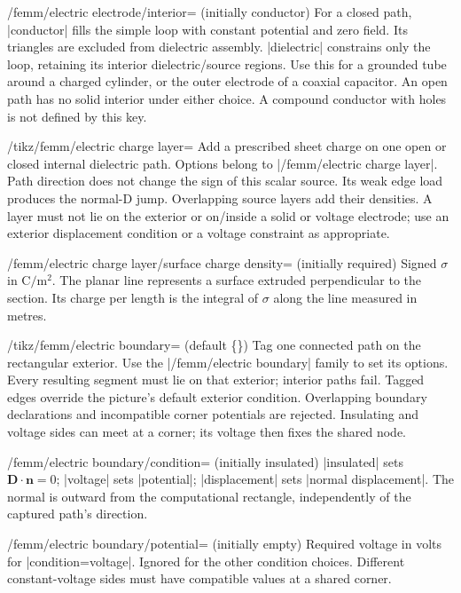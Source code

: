 \begin{key}{/femm/electric electrode/interior= (initially conductor)}
For a closed path, |conductor| fills the simple loop with constant potential
and zero field. Its triangles are excluded from dielectric assembly.
|dielectric| constrains only the loop, retaining its interior dielectric/source
regions. Use this for a grounded tube around a charged cylinder, or the outer
electrode of a coaxial capacitor. An open path has no solid interior under
either choice. A compound conductor with holes is not defined by this key.
\end{key}
\begin{key}{/tikz/femm/electric charge layer=}
Add a prescribed sheet charge on one open or closed internal dielectric path.
Options belong to |/femm/electric charge layer|. Path direction does not change
the sign of this scalar source. Its weak edge load produces the normal-D jump.
Overlapping source layers add their densities. A layer must not lie on the
exterior or on/inside a solid or voltage electrode; use an exterior displacement
condition or a voltage constraint as appropriate.
\end{key}
\begin{key}{/femm/electric charge layer/surface charge density= (initially \normalfont required)}
Signed $\sigma$ in $\mathrm{C/m^2}$. The planar line represents a surface
extruded perpendicular to the section. Its charge per length is the integral
of $\sigma$ along the line measured in metres.
\end{key}
\begin{key}{/tikz/femm/electric boundary= (default \{\})}
Tag one connected path on the rectangular exterior.
Use the |/femm/electric boundary| family to set its options. Every resulting segment must lie on that exterior;
interior paths fail. Tagged edges override the picture's default exterior
condition. Overlapping boundary declarations and incompatible corner potentials
are rejected. Insulating and voltage sides can meet at a corner; its voltage
then fixes the shared node.
\end{key}
\begin{key}{/femm/electric boundary/condition= (initially insulated)}
|insulated| sets $\mathbf D\cdot\mathbf n=0$; |voltage| sets |potential|;
|displacement| sets |normal displacement|. The normal is outward from the
computational rectangle, independently of the captured path's direction.
\end{key}
\begin{key}{/femm/electric boundary/potential= (initially \normalfont empty)}
Required voltage in volts for |condition=voltage|. Ignored for the other
condition choices. Different constant-voltage sides must have compatible
values at a shared corner.
\end{key}
